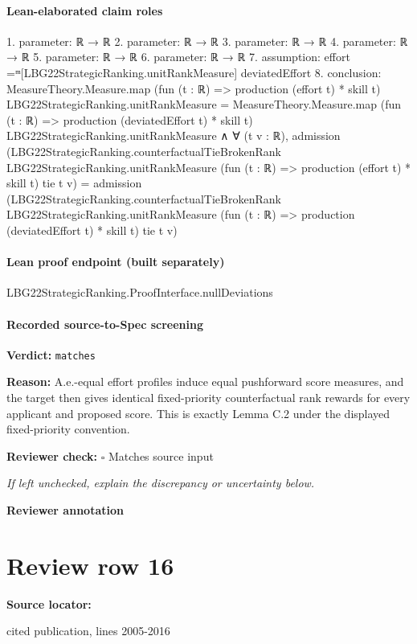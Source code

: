 \documentclass[10pt]{article}
\newcommand{\reviewerbox}{%
  \par\noindent\fbox{\parbox{0.96\linewidth}{\rule{0pt}{0.38in}}}\par
}
\newcommand{\reviewmatch}[1]{%
  \par\noindent\textbf{Reviewer check:} $\square$\; #1\par
  \noindent\emph{If left unchecked, explain the discrepancy or uncertainty below.}\par
}
\begin{document}
\paragraph{Lean-elaborated claim roles}\begin{ReviewVerbatim}
1. parameter: ℝ → ℝ
2. parameter: ℝ → ℝ
3. parameter: ℝ → ℝ
4. parameter: ℝ → ℝ
5. parameter: ℝ → ℝ
6. parameter: ℝ → ℝ
7. assumption: effort =ᵐ[LBG22StrategicRanking.unitRankMeasure] deviatedEffort
8. conclusion: MeasureTheory.Measure.map (fun (t : ℝ) => production (effort t) * skill t) LBG22StrategicRanking.unitRankMeasure =
    MeasureTheory.Measure.map (fun (t : ℝ) => production (deviatedEffort t) * skill t)
      LBG22StrategicRanking.unitRankMeasure ∧
  ∀ (t v : ℝ),
    admission
        (LBG22StrategicRanking.counterfactualTieBrokenRank LBG22StrategicRanking.unitRankMeasure
          (fun (t : ℝ) => production (effort t) * skill t) tie t v) =
      admission
        (LBG22StrategicRanking.counterfactualTieBrokenRank LBG22StrategicRanking.unitRankMeasure
          (fun (t : ℝ) => production (deviatedEffort t) * skill t) tie t v)
\end{ReviewVerbatim}

\paragraph{Lean proof endpoint (built separately)}\begin{ReviewVerbatim}
LBG22StrategicRanking.ProofInterface.nullDeviations
\end{ReviewVerbatim}

\paragraph{Recorded source-to-Spec screening}
\textbf{Verdict:} \texttt{matches}
\\
{\raggedright
\textbf{Reason:} A.\allowbreak{}e.\allowbreak{}-\allowbreak{}equal effort profiles induce equal pushforward score measures, and the target then gives identical fixed-\allowbreak{}priority counterfactual rank rewards for every applicant and proposed score.\allowbreak{} This is exactly Lemma C.\allowbreak{}2 under the displayed fixed-\allowbreak{}priority convention.\allowbreak{}
\par}
\reviewmatch{Matches source input}
\noindent\textbf{Reviewer annotation}\par
\reviewerbox
\clearpage
\hypertarget{source-claim-12dd3b600e58e716}{}
\section*{Review row 16}
\textbf{Source locator:} {\footnotesize\raggedright cited publication, lines 2005-\allowbreak{}2016\par}
\end{document}
